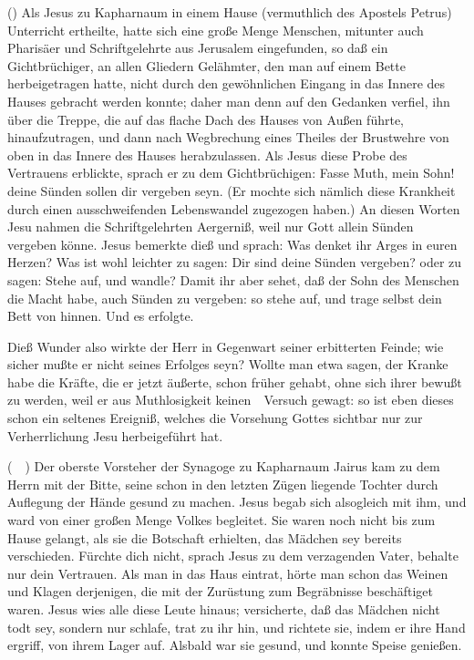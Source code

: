 \begin{aufza}
\item {} () Als Jesus zu Kapharnaum in einem Hause (vermuthlich des Apostels Petrus) Unterricht ertheilte, hatte sich eine große Menge Menschen, mitunter auch Pharisäer und Schriftgelehrte aus Jerusalem eingefunden, so daß ein Gichtbrüchiger, an allen Gliedern Gelähmter, den man auf einem Bette herbeigetragen hatte, nicht durch den gewöhnlichen Eingang in das Innere des Hauses gebracht werden konnte; daher man denn auf den Gedanken verfiel, ihn über die Treppe, die auf das flache Dach des Hauses von Außen führte, hinaufzutragen, und dann nach Wegbrechung eines Theiles der Brustwehre von oben in das Innere des Hauses herabzulassen. Als Jesus diese Probe des Vertrauens erblickte, sprach er zu dem Gichtbrüchigen: Fasse Muth, mein Sohn! deine Sünden sollen dir vergeben seyn. (Er mochte sich nämlich diese Krankheit durch einen ausschweifenden Lebenswandel zugezogen haben.) An diesen Worten Jesu nahmen die Schriftgelehrten Aergerniß, weil nur Gott allein Sünden vergeben könne. Jesus bemerkte dieß und sprach: Was denket ihr Arges in euren Herzen? Was ist wohl leichter zu sagen: Dir sind deine Sünden vergeben? oder zu sagen: Stehe auf, und wandle? Damit ihr aber sehet, daß der Sohn des Menschen die Macht habe, auch Sünden zu vergeben: so stehe auf, und trage selbst dein Bett von hinnen. Und es erfolgte.\par
Dieß Wunder also wirkte der Herr in Gegenwart seiner erbitterten Feinde; wie sicher mußte er nicht seines Erfolges seyn? Wollte man etwa sagen, der Kranke habe die Kräfte, die er jetzt äußerte, schon früher gehabt, ohne sich ihrer bewußt zu werden, weil er aus Muthlosigkeit keinen~\ Versuch gewagt: so ist eben dieses schon ein seltenes Ereigniß, welches die Vorsehung Gottes sichtbar nur zur Verherrlichung Jesu herbeigeführt hat.
\item {} (\ \ ) Der oberste Vorsteher der Synagoge zu Kapharnaum Jairus kam zu dem Herrn mit der Bitte, seine schon in den letzten Zügen liegende Tochter durch Auflegung der Hände gesund zu machen. Jesus begab sich alsogleich mit ihm, und ward von einer großen Menge Volkes begleitet. Sie waren noch nicht bis zum Hause gelangt, als sie die Botschaft erhielten, das Mädchen sey bereits verschieden. Fürchte dich nicht, sprach Jesus zu dem verzagenden Vater, behalte nur dein Vertrauen. Als man in das Haus eintrat, hörte man schon das Weinen und Klagen derjenigen, die mit der Zurüstung zum Begräbnisse beschäftiget waren. Jesus wies alle diese Leute hinaus; versicherte, daß das Mädchen nicht todt sey, sondern nur schlafe, trat zu ihr hin, und richtete sie, indem er ihre Hand ergriff, von ihrem Lager auf. Alsbald war sie gesund, und konnte Speise genießen.
\end{aufza}\par
